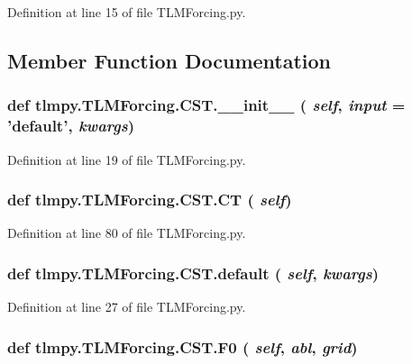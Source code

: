 Definition at line 15 of file TLMForcing.py.

\subsection{Member Function Documentation}
\hypertarget{classtlmpy_1_1TLMForcing_1_1CST_acf2577b0954f902936d9743c8a8ce349}{
\subsubsection[{\_\-\_\-init\_\-\_\-}]{\setlength{\rightskip}{0pt plus 5cm}def tlmpy.TLMForcing.CST.\_\-\_\-init\_\-\_\- ( {\em self}, \/   {\em input} = {\ttfamily 'default'}, \/   {\em kwargs})}}
\label{classtlmpy_1_1TLMForcing_1_1CST_acf2577b0954f902936d9743c8a8ce349}


Definition at line 19 of file TLMForcing.py.\hypertarget{classtlmpy_1_1TLMForcing_1_1CST_ac7fd8353f840a39dc35b943010efad9e}{
\subsubsection[{CT}]{\setlength{\rightskip}{0pt plus 5cm}def tlmpy.TLMForcing.CST.CT ( {\em self})}}
\label{classtlmpy_1_1TLMForcing_1_1CST_ac7fd8353f840a39dc35b943010efad9e}


Definition at line 80 of file TLMForcing.py.\hypertarget{classtlmpy_1_1TLMForcing_1_1CST_ace989ba8681eb2bacb224afc69ca3981}{
\subsubsection[{default}]{\setlength{\rightskip}{0pt plus 5cm}def tlmpy.TLMForcing.CST.default ( {\em self}, \/   {\em kwargs})}}
\label{classtlmpy_1_1TLMForcing_1_1CST_ace989ba8681eb2bacb224afc69ca3981}


Definition at line 27 of file TLMForcing.py.\hypertarget{classtlmpy_1_1TLMForcing_1_1CST_a1ef7c12b51fddea842fc4e205fe57648}{
\subsubsection[{F0}]{\setlength{\rightskip}{0pt plus 5cm}def tlmpy.TLMForcing.CST.F0 ( {\em self}, \/   {\em abl}, \/   {\em grid})}}
\label{classtlmpy_1_1TLMForcing_1_1CST_a1ef7c12b51fddea842fc4e205fe57648}


